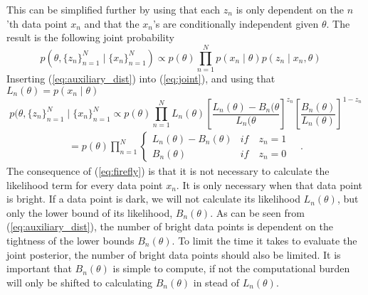 \documentclass{article}
\theoremstyle{definition}
\begin{document}
 This can be simplified further by using that each $z_n$ is only dependent on the $n$'th data point $x_n$ and that the $x_n$'s are conditionally independent given $\theta$. 
 The result is the following joint probability 
\begin{equation}\label{eq:joint}
           p(\theta, \{z_n\}_{n=1}^N \mid \{x_n\}_{n=1}^N) \propto p(\theta) \prod_{n=1}^N p(x_n\mid\theta)p(z_n\mid x_n, \theta) \quad
\end{equation}
Inserting (\ref{eq:auxiliary_dist}) into (\ref{eq:joint}), and using that $L_n(\theta) = p(x_n\mid\theta)$
\begin{equation}
     p(\theta, \{z_n\}_{n=1}^N\mid\{x_n\}_{n=1}^N \propto p(\theta) \prod_{n=1}^N L_n(\theta)\left[\frac{L_n(\theta) - B_n(\theta}{L_n(\theta}\right]^{z_n}\left[\frac{B_n(\theta)}{L_n(\theta)}\right]^{1-z_n} 
\end{equation}
\begin{equation}
\label{eq:firefly}
\begin{split}
     =p(\theta) \prod_{n = 1}^N
     \begin{cases}
        L_n(\theta) - B_n(\theta) & if \quad z_n = 1 \\
        B_n(\theta) & if \quad z_n = 0
     \end{cases}\quad.
\end{split}
\end{equation}
The consequence of (\ref{eq:firefly}) is that it is not necessary to calculate the likelihood term for every data point $x_n$. 
It is only necessary when that data point is bright.
If a data point is dark, we will not calculate its likelihood $L_n(\theta)$, but only the lower bound of its likelihood, $B_n(\theta)$. 
As can be seen from (\ref{eq:auxiliary_dist}), the number of bright data points is dependent on the tightness of the lower bounds $B_n(\theta)$.
To limit the time it takes to evaluate the joint posterior, the number of bright data points should also be limited.
It is important that $B_n(\theta)$ is simple to compute, if not the computational burden will only be shifted to calculating $B_n(\theta)$ in stead of $L_n(\theta)$. 
\end{document}
